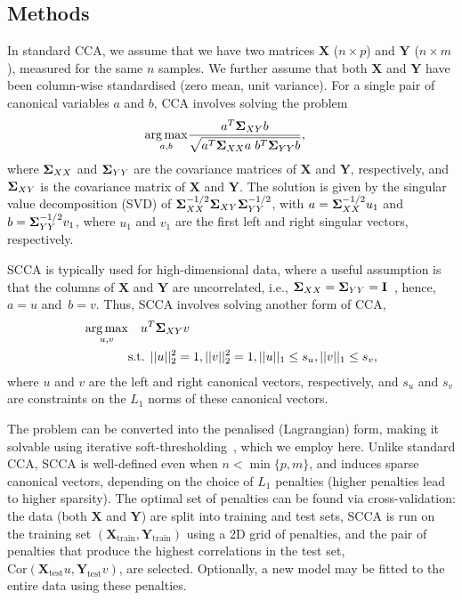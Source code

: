 \vspace*{-12pt}
\begin{methods}
\section{Methods}

In standard CCA, we assume that we have two matrices $\mathbf{X}$ ($n \times p$)
and $\mathbf{Y}$ ($n \times m$), measured for the same $n$ samples.
We further assume that both $\mathbf{X}$ and $\mathbf{Y}$ have been
column-wise standardised (zero mean, unit variance).  For a single pair of 
canonical variables $a$ and $b$, CCA involves solving the problem
\vspace*{-10pt}
\begin{align}
\argmax_{a,b} & \frac{a^T \s_{XY} b}{\sqrt{a^T \s_{XX} a \; b^T \s_{YY} b}},
\label{eqn:cca}
\vspace*{-10pt}
\end{align}
where $\mathbf{\Sigma}_{XX}$ and $\mathbf{\Sigma}_{YY}$ are the covariance matrices of
$\mathbf{X}$ and $\mathbf{Y}$, respectively, and $\mathbf{\Sigma}_{XY}$ is the
covariance matrix of $\mathbf{X}$ and $\mathbf{Y}$. The solution is given by
the singular value decomposition (SVD) of $\mathbf{\Sigma}_{XX}^{-1/2} \mathbf{\Sigma}_{XY}
\mathbf{\Sigma}_{YY}^{-1/2}$, with $a = \mathbf{\Sigma}_{XX}^{-1/2} u_1$ and $b =
\mathbf{\Sigma}_{YY}^{-1/2} v_1$, where $u_1$ and $v_1$ are the first left and right
singular vectors, respectively.

SCCA is typically used for high-dimensional data, where a useful assumption is that
the columns of $\mathbf{X}$ and $\mathbf{Y}$ are uncorrelated,
i.e., $\mathbf{\Sigma}_{XX}=\mathbf{\Sigma}_{YY}=\mathbf{I}$~\citep{Parkhomenko2009},
hence, $a = u$ and~$b = v$. Thus, SCCA involves solving another form of CCA,
\vspace*{-6pt}
\begin{align}
\argmax_{u,v} &  \quad u^T \s_{XY} v \notag \\
 & \mbox{s.t. } ||u||_2^2=1, ||v||_2^2 = 1, ||u||_1 \le s_u, ||v||_1 \le s_v,
\label{eqn:scca}\vspace*{-10pt}
\end{align}
where $u$ and $v$ are the left and right canonical vectors, respectively, and
$s_u$ and $s_v$ are constraints on the $L_1$ norms of these canonical vectors.

The problem can be converted into the penalised (Lagrangian) form, making it
solvable using iterative soft-thresholding~\citep{Parkhomenko2009}, which we
employ here.  Unlike standard CCA, SCCA is well-defined even when $n{<}\min
\{p, m\}$, and induces sparse canonical vectors, depending on the choice of
$L_1$ penalties (higher penalties lead to higher sparsity). The optimal set
of penalties can be found via cross-validation: the data (both $\mathbf{X}$
and $\mathbf{Y}$) are split into training and test sets, SCCA is run on
the training set $(\mathbf{X}_{\mbox{train}}, \mathbf{Y}_{\mbox{train}})$
using a 2D grid of penalties, and the pair of penalties that produce the
highest correlations in the test set, $\mbox{Cor}(\mathbf{X}_{\mbox{test}}
u, \mathbf{Y}_{\mbox{test}} v)$, are selected.  Optionally, a new model may
be fitted to the entire data using these penalties.


\end{methods}
